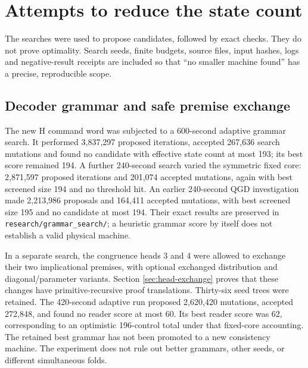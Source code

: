 \documentclass[11pt,a4paper]{article}
\begin{document}








\section{Attempts to reduce the state count}
\label{sec:reduction-searches}

The searches were used to propose candidates, followed by exact checks.
They do not prove optimality. Search seeds, finite budgets, source files,
input hashes, logs and negative-result receipts are included so that
``no smaller machine found'' has a precise, reproducible scope.

\subsection{Decoder grammar and safe premise exchange}

The new H command word was subjected to a 600-second adaptive grammar
search. It performed 3,837,297 proposed iterations, accepted 267,636
search mutations and found no candidate with effective state count at
most 193; its best score remained 194. A further 240-second search varied
the symmetric fixed core: 2,871,597 proposed iterations and 201,074
accepted mutations, again with best screened size 194 and no threshold
hit. An earlier 240-second QGD investigation made 2,213,986 proposals and
164,411 accepted mutations, with best screened size 195 and no candidate
at most 194. Their exact results are preserved in
\texttt{research/grammar\_search/}; a heuristic grammar score by itself
does not establish a valid physical machine.

In a separate search, the congruence heads 3 and 4 were allowed to exchange
their two implicational premises, with optional exchanged distribution
and diagonal/parameter variants. Section \ref{sec:head-exchange} proves
that these changes have primitive-recursive proof translations. Thirty-six
seed trees were retained. The 420-second adaptive run proposed 2,620,420
mutations, accepted 272,848, and found no reader score at most 60.
Its best reader score was 62, corresponding to an optimistic 196-control
total under that fixed-core accounting. The retained best grammar has
not been promoted to a new consistency machine. The experiment does not
rule out better grammars, other seeds, or different simultaneous folds.
\end{document}
